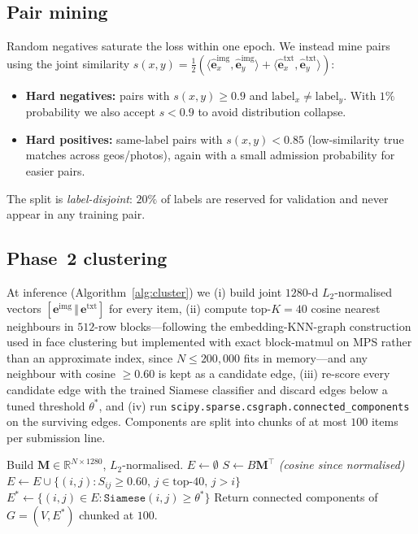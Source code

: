 \documentclass[10pt,conference]{IEEEtran}
\begin{document}
\subsection{Pair mining}
Random negatives saturate the loss within one epoch. We instead mine pairs
using the joint similarity $s(x,y) = \tfrac{1}{2}(\langle
\hat{\mathbf{e}}_x^{\text{img}}, \hat{\mathbf{e}}_y^{\text{img}}\rangle +
\langle \hat{\mathbf{e}}_x^{\text{txt}},
\hat{\mathbf{e}}_y^{\text{txt}}\rangle)$:
\begin{itemize}
\item \textbf{Hard negatives:} pairs with $s(x,y) \ge 0.9$ and
$\text{label}_x \ne \text{label}_y$. With $1\%$ probability we also accept
$s < 0.9$ to avoid distribution collapse.
\item \textbf{Hard positives:} same-label pairs with $s(x,y) < 0.85$
(low-similarity true matches across geos/photos), again with a small
admission probability for easier pairs.
\end{itemize}
The split is \emph{label-disjoint}: $20\%$ of labels are reserved for
validation and never appear in any training pair.

\subsection{Phase~2 clustering}
At inference (Algorithm~\ref{alg:cluster}) we (i) build joint $1280$-d
$L_2$-normalised vectors $[\mathbf{e}^{\text{img}} \,\Vert\,
\mathbf{e}^{\text{txt}}]$ for every item, (ii) compute top-$K{=}40$ cosine
nearest neighbours in $512$-row blocks---following the
embedding-KNN-graph construction used in face clustering
\cite{otto_facecluster,yang_lcluster} but implemented with exact block-matmul
on MPS rather than an approximate index, since $N \le 200{,}000$ fits in
memory---and any neighbour with cosine $\ge 0.60$ is kept as a candidate edge, (iii) re-score
every candidate edge with the trained Siamese classifier and discard edges
below a tuned threshold $\theta^\ast$, and (iv) run
\texttt{scipy.sparse.csgraph.connected\_components} on the surviving edges.
Components are split into chunks of at most $100$ items per submission line.

\begin{algorithm}[H]
\caption{End-to-end clustering at inference.}
\label{alg:cluster}
\begin{algorithmic}[1]
\STATE Build $\mathbf{M} \in \mathbb{R}^{N \times 1280}$, $L_2$-normalised.
\STATE $E \leftarrow \emptyset$
  \STATE $S \leftarrow B \mathbf{M}^\top$ \quad \emph{(cosine since normalised)}
  \STATE $E \leftarrow E \cup \{(i,j) : S_{ij} \ge 0.60,\, j \in \text{top-}40,\, j>i\}$
\ENDFOR
\STATE $E^\ast \leftarrow \{(i,j) \in E : \texttt{Siamese}(i,j) \ge \theta^\ast\}$
\STATE Return connected components of $G=(V,E^\ast)$ chunked at $100$.
\end{algorithmic}
\end{algorithm}
\end{document}
